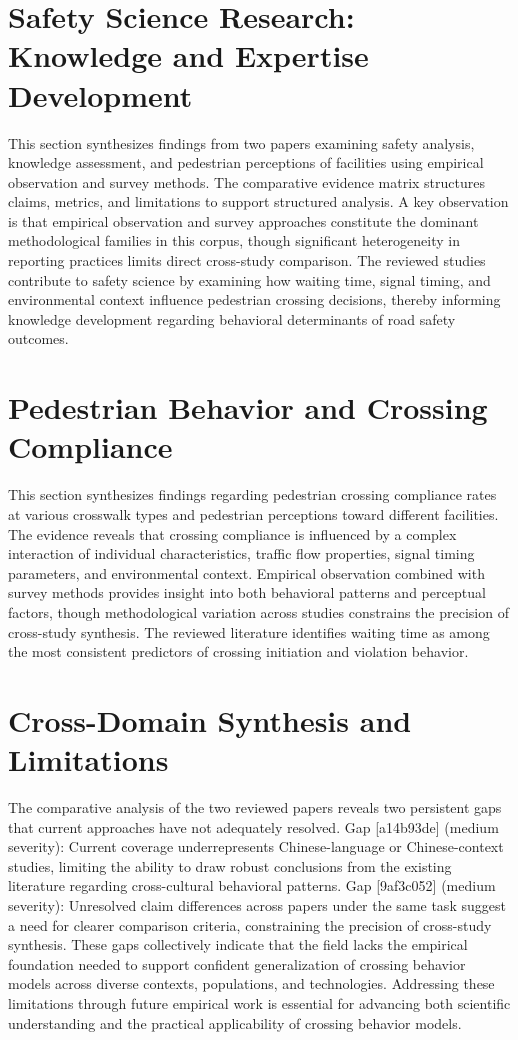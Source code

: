 \documentclass{article}
\begin{document}
\section{Safety Science Research: Knowledge and Expertise Development}
This section synthesizes findings from two papers examining safety analysis, knowledge assessment, and pedestrian perceptions of facilities using empirical observation and survey methods. The comparative evidence matrix structures claims, metrics, and limitations to support structured analysis. A key observation is that empirical observation and survey approaches constitute the dominant methodological families in this corpus, though significant heterogeneity in reporting practices limits direct cross-study comparison. The reviewed studies contribute to safety science by examining how waiting time, signal timing, and environmental context influence pedestrian crossing decisions, thereby informing knowledge development regarding behavioral determinants of road safety outcomes.

\section{Pedestrian Behavior and Crossing Compliance}
This section synthesizes findings regarding pedestrian crossing compliance rates at various crosswalk types and pedestrian perceptions toward different facilities. The evidence reveals that crossing compliance is influenced by a complex interaction of individual characteristics, traffic flow properties, signal timing parameters, and environmental context. Empirical observation combined with survey methods provides insight into both behavioral patterns and perceptual factors, though methodological variation across studies constrains the precision of cross-study synthesis. The reviewed literature identifies waiting time as among the most consistent predictors of crossing initiation and violation behavior.

\section{Cross-Domain Synthesis and Limitations}
The comparative analysis of the two reviewed papers reveals two persistent gaps that current approaches have not adequately resolved. Gap [a14b93de] (medium severity): Current coverage underrepresents Chinese-language or Chinese-context studies, limiting the ability to draw robust conclusions from the existing literature regarding cross-cultural behavioral patterns. Gap [9af3c052] (medium severity): Unresolved claim differences across papers under the same task suggest a need for clearer comparison criteria, constraining the precision of cross-study synthesis. These gaps collectively indicate that the field lacks the empirical foundation needed to support confident generalization of crossing behavior models across diverse contexts, populations, and technologies. Addressing these limitations through future empirical work is essential for advancing both scientific understanding and the practical applicability of crossing behavior models.
\end{document}
